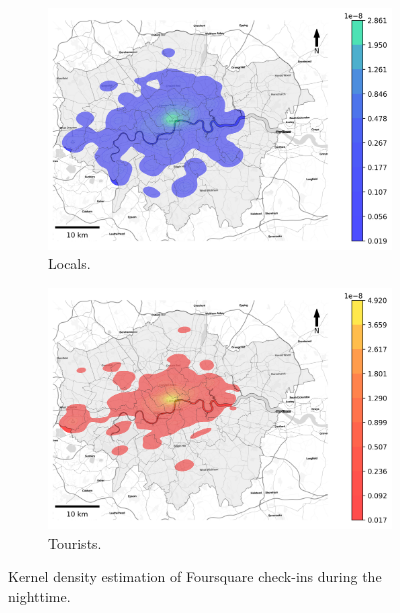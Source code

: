 \documentclass{article}
\theoremstyle{remark}
\begin{document}
\begin{figure}[!h]

\begin{subfigure}{0.5\textwidth}
\includegraphics[width=1\linewidth]{figures/kde_locals_nighttime.png} 
\caption{Locals.}
\label{fig:kde_locals_nighttime}
\end{subfigure}
\begin{subfigure}{0.5\textwidth}
\includegraphics[width=1\linewidth]{figures/kde_tourists_nighttime.png}
\caption{Tourists.}
\label{fig:kde_tourists_nighttime}
\end{subfigure}

\caption{Kernel density estimation of Foursquare check-ins during the nighttime.} \label{fig:kde_nighttime}
\end{figure}
\end{document}
